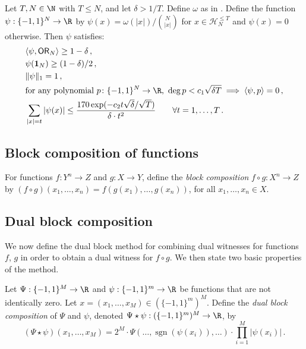 \documentclass{toc}
\newcommand{\sgn}{\mathrm{sign}}
\newcommand{\OR}{\mathsf{ OR}}
\newcommand{\bits}{\{-1,1\}}
\newcommand{\ls}{\star}
\renewcommand{\sgn}{\operatorname{sgn}}
\begin{document}
\begin{proposition} \label{prop:or-dual}
	Let $T, N \in \N$ with $T \le N$, and let $\delta > 1/T$. Define $\omega$ as in . Define the function $\psi: \bits^N \to \R$ by $\psi(x) = \omega(|x|) / {N \choose |x|}$ for $x \in \mathcal{H}_N^{\le T}$ and $\psi(x) = 0$ otherwise. Then $\psi$ satisfies:
	\begin{align} &\langle \psi, \OR_N \rangle \ge 1-\delta\,,  \label{eqn:or-corr} \\
& \psi(\mathbf{1}_{N}) \ge (1-\delta)/2\,, \label{eqn:or-loaded}\\
	& \|\psi\|_1 = 1\,,   \label{eqn:or-norm}\\
%
	& \text{for any polynomial } p \colon \bits^N \to \R\text{, } \deg p < c_1\sqrt{\delta T} \implies \langle \psi, p \rangle = 0\,, \label{eqn:or-phd}\\
	& \sum_{|x|=t} |\psi(x)| \leq \frac{170 \exp(-c_2 t \sqrt{\delta} /  \sqrt{T})}{\delta \cdot t^2} \qquad \forall t = 1, \dots, T\,.\label{eqn:or-decay}
	\end{align}
\end{proposition}

\subsection{Block composition of functions}
\begin{definition}
	For functions $f : Y^n \to Z$ and $g: X \to Y$, define the \emph{block composition} $f \circ g : X^n \to Z$ by $(f\circ g)(x_1, \dots, x_n) = f(g(x_1), \dots, g(x_n))$, for all $x_1, \dots, x_n \in X$.
\end{definition}

\subsection{Dual block composition}
\label{s:dualblockcomposition}
We now define the dual block method \cite{shizhu, lee, sherstovhalfspaces1} for combining dual witnesses for functions $f$, $g$ in order to obtain a dual witness
for $f \circ g$. We then state two basic properties
%
of the method.   %
\label{sec:ls}
\begin{definition}
	Let $\Psi : \bits^M \to \R$ and $\psi : \bits^m \to \R$ be functions that are not identically zero. Let $x=(x_1, \dots, x_M) \in \left(\bits^{m}\right)^M$. Define the \emph{dual block composition} of $\Psi$ and $\psi$, denoted $\Psi \ls \psi : (\bits^m)^M \to \R$, by
	\[(\Psi \ls \psi)(x_1, \dots, x_M) = 2^M \cdot \Psi(\dots, \sgn\left(\psi(x_i)\right), \dots) \cdot \prod_{i = 1}^M |\psi(x_i)|\,.\]
\end{definition}
\end{document}
